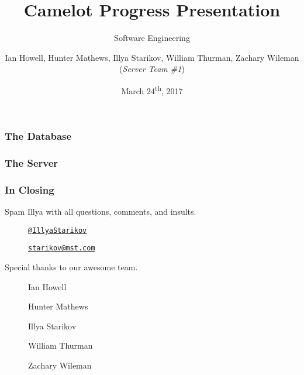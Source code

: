 \documentclass{beamer}
\title{Camelot Progress Presentation}
\subtitle{Software Engineering}
\author{Ian Howell, Hunter Mathews, Illya Starikov, William Thurman, Zachary Wileman (\textit{Server Team \#1})}
\date{March 24\textsuperscript{th}, 2017}
\institute{Missouri University of Science and Technology}
\begin{document}
\begin{frame}
    \vfill
    \centering
\end{frame}

\begin{frame}
    \maketitle
\end{frame}

\begin{frame}
    \frametitle{The Database}
\end{frame}

\begin{frame}
    \frametitle{The Server}
\end{frame}


\begin{frame}
    \frametitle{In Closing}

    Spam Illya with all questions, comments, and insults.
    \begin{description}
        \item[\faGithub]  \href{https://github.com/IllyaStarikov}{\nolinkurl{@IllyaStarikov}}
        \item[\faComment] \href{mailto:starikov@mst.edu}{\nolinkurl{starikov@mst.com}}
    \end{description}

    Special thanks to our awesome team.
    \begin{description}
        \item[\faUser] Ian Howell
        \item[\faUser] Hunter Mathews
        \item[\faUser] Illya Starikov
        \item[\faUser] William Thurman
        \item[\faUser] Zachary Wileman
    \end{description}
\end{frame}
\end{document}
